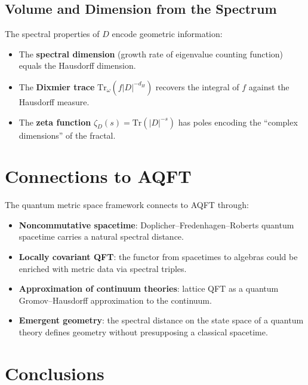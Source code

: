 \documentclass[11pt,a4paper]{article}
\begin{document}
\subsection{Volume and Dimension from the Spectrum}

The spectral properties of $D$ encode geometric information:
\begin{itemize}[nosep]
  \item The \textbf{spectral dimension} (growth rate of eigenvalue counting
        function) equals the Hausdorff dimension.
  \item The \textbf{Dixmier trace} $\mathrm{Tr}_\omega(f|D|^{-d_H})$
        recovers the integral of $f$ against the Hausdorff measure.
  \item The \textbf{zeta function} $\zeta_D(s) = \mathrm{Tr}(|D|^{-s})$
        has poles encoding the ``complex dimensions'' of the fractal.
\end{itemize}

\section{Connections to AQFT}

The quantum metric space framework connects to AQFT through:
\begin{itemize}[nosep]
  \item \textbf{Noncommutative spacetime}: Doplicher--Fredenhagen--Roberts
        quantum spacetime carries a natural spectral distance.
  \item \textbf{Locally covariant QFT}: the functor from spacetimes to
        algebras could be enriched with metric data via spectral triples.
  \item \textbf{Approximation of continuum theories}: lattice QFT as a
        quantum Gromov--Hausdorff approximation to the continuum.
  \item \textbf{Emergent geometry}: the spectral distance on the state
        space of a quantum theory defines geometry without presupposing
        a classical spacetime.
\end{itemize}

\section{Conclusions}
\end{document}
